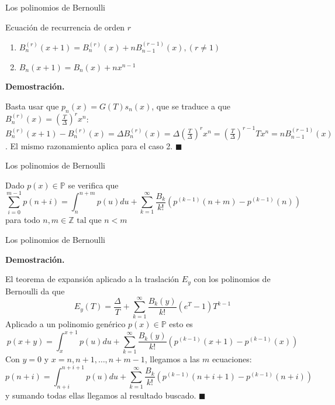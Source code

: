 \documentclass{beamer}
\newenvironment{teorema}[1][]{
  \begin{tcolorbox}[colback=darkred!10, colframe=darkred!90, title=Teorema\ #1, fonttitle=\bfseries]
}{
  \end{tcolorbox}
}
\newenvironment{demo}{%
  \par\medskip\noindent\textbf{Demostración.}\hspace{0.5em}%
}{%
  \hfill$\blacksquare$\par\medskip%
}
\newcommand{\Z}{\mathbb{Z}} %
\newcommand{\poly}{\mathbb{P}} %
\begin{document}
\begin{frame}{Los polinomios de Bernoulli}
  \begin{block}{Ecuación de recurrencia de orden $r$}
    \begin{enumerate}
      \item $\displaystyle B_n^{(r)}(x +1) = B_n^{(r)}(x) + nB_{n-1}^{(r-1)}(x), (r \neq 1)$
      \item $\displaystyle B_n(x+1) = B_n(x) + nx^{n-1}$
    \end{enumerate}
  \end{block}

  \begin{demo}
    Basta usar que $p_n(x) = G(T)s_n(x)$, que se traduce a que $B_n^{(r)}(x) = (\frac{T}{\Delta})^r x^n$:
    \small{$ \displaystyle B_n^{(r)}(x+1) - B_n^{(r)}(x) = \Delta B_n^{(r)}(x) = \Delta \left(\frac{T}{\Delta}\right)^r x^n = \left(\frac{T}{\Delta}\right)^{r-1} T x^n = nB_{n-1}^{(r-1)}(x)$}. El mismo razonamiento aplica para el caso 2.
  \end{demo}
\end{frame}

\begin{frame}{Los polinomios de Bernoulli}
  \begin{teorema}[(sumación de Euler-Maclaurin para polinomios)]
    Dado $p(x) \in \poly$ se verifica que
    \begin{equation*}
        \sum_{i=0}^{m-1} p(n+i) = \int_{n}^{n + m} p(u)du + \sum_{k = 1}^\infty \frac{B_k}{k!}\left(p^{(k-1)}(n + m) - p^{(k-1)}(n) \right)
    \end{equation*}
    para todo $n, m \in \Z \text{ tal que } n < m$
  \end{teorema}
\end{frame}

\begin{frame}{Los polinomios de Bernoulli}
  \begin{demo}
    El teorema de expansión aplicado a la traslación $E_y$ con los polinomios de Bernoulli da que
    \begin{equation*}
        E_y(T) = \frac{\Delta}{T} + \sum_{k=1}^\infty \frac{B_k(y)}{k!} (e^T - 1) T^{k-1} 
    \end{equation*}
    Aplicado a un polinomio genérico $p(x) \in \poly$ esto es
    \begin{equation*}
        p(x+y) = \int_{x}^{x+1} p(u)du + \sum_{k=1}^\infty \frac{B_k(y)}{k!} \left(p^{(k-1)}(x+1) - p^{(k-1)}(x)\right)
    \end{equation*}
    Con $y = 0$ y $x = n, n + 1, \dots, n + m -1$, llegamos a las $m$ ecuaciones:
    \begin{equation*}
        p(n + i) = \int_{n+i}^{n + i + 1} p(u)du + \sum_{k=1}^\infty \frac{B_k}{k!} \left(p^{(k-1)}(n + i + 1) - p^{(k-1)}(n + i)\right)
    \end{equation*}
    y sumando todas ellas llegamos al resultado buscado.
  \end{demo}
\end{frame}
\end{document}
